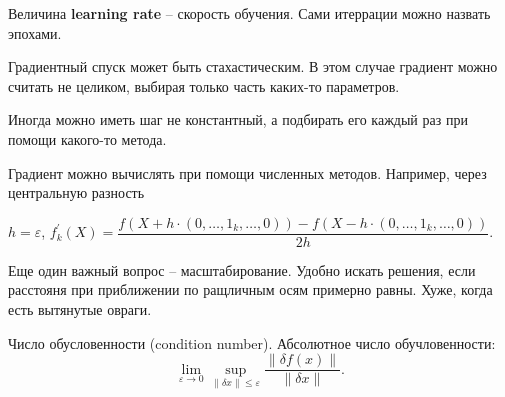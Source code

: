 Величина \textbf{learning rate} -- скорость обучения.
Сами итеррации можно назвать эпохами.

Градиентный спуск может быть стахастическим.
В этом случае градиент можно считать не целиком, выбирая только часть каких-то параметров.

Иногда можно иметь шаг не константный, а подбирать его каждый раз при помощи какого-то метода.

Градиент можно вычислять при помощи численных методов.
Например, через центральную разность

$h = \varepsilon$, $f_k^{\prime} (X) = \dfrac{f(X + h \cdot (0, \dots, 1_k, \dots, 0)) - f(X - h \cdot (0, \dots, 1_k, \dots, 0))}{2h}$.

Еще один важный вопрос -- масштабирование. Удобно искать решения, если расстояня при приближении по ращличным осям примерно равны. Хуже, когда есть вытянутые овраги.

Число обусловенности (condition number).
Абсолютное число обучловенности:
\[
    \lim_{\varepsilon \to 0} \sup_{\|\delta x \| \leqslant \varepsilon} \dfrac{\|\delta f(x)\|}{\| \delta x \|}.
\]


 